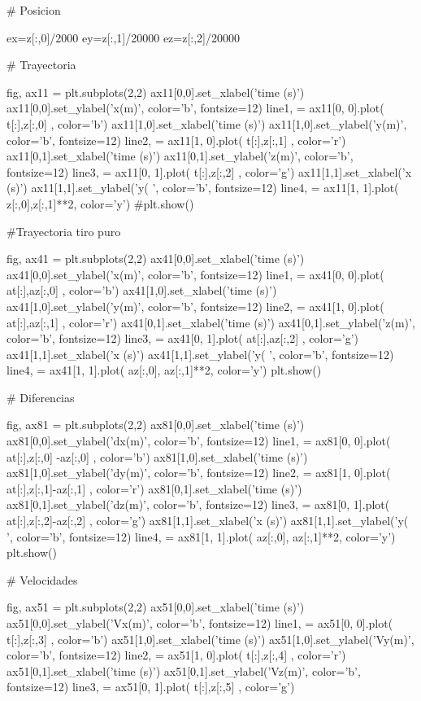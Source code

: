 \documentclass{article}
\begin{document}
\begin{python}
# Posicion

ex=z[:,0]/2000
ey=z[:,1]/20000
ez=z[:,2]/20000

# Trayectoria 

fig, ax11 = plt.subplots(2,2)
ax11[0,0].set_xlabel('time (s)')
ax11[0,0].set_ylabel('x(m)', color='b', fontsize=12)
line1, = ax11[0, 0].plot( t[:],z[:,0] , color='b')
ax11[1,0].set_xlabel('time (s)')
ax11[1,0].set_ylabel('y(m)', color='b', fontsize=12)
line2, = ax11[1, 0].plot( t[:],z[:,1] , color='r')
ax11[0,1].set_xlabel('time (s)')
ax11[0,1].set_ylabel('z(m)', color='b', fontsize=12)
line3, = ax11[0, 1].plot( t[:],z[:,2] , color='g')
ax11[1,1].set_xlabel('x (s)')
ax11[1,1].set_ylabel('y( ', color='b', fontsize=12)
line4, = ax11[1, 1].plot( z[:,0],z[:,1]**2, color='y')
#plt.show()

#Trayectoria tiro puro

fig, ax41 = plt.subplots(2,2)
ax41[0,0].set_xlabel('time (s)')
ax41[0,0].set_ylabel('x(m)', color='b', fontsize=12)
line1, = ax41[0, 0].plot( at[:],az[:,0] , color='b')
ax41[1,0].set_xlabel('time (s)')
ax41[1,0].set_ylabel('y(m)', color='b', fontsize=12)
line2, = ax41[1, 0].plot( at[:],az[:,1] , color='r')
ax41[0,1].set_xlabel('time (s)')
ax41[0,1].set_ylabel('z(m)', color='b', fontsize=12)
line3, = ax41[0, 1].plot( at[:],az[:,2] , color='g')
ax41[1,1].set_xlabel('x (s)')
ax41[1,1].set_ylabel('y( ', color='b', fontsize=12)
line4, = ax41[1, 1].plot( az[:,0], az[:,1]**2, color='y')
plt.show()


# Diferencias

fig, ax81 = plt.subplots(2,2)
ax81[0,0].set_xlabel('time (s)')
ax81[0,0].set_ylabel('dx(m)', color='b', fontsize=12)
line1, = ax81[0, 0].plot( at[:],z[:,0] -az[:,0] , color='b')
ax81[1,0].set_xlabel('time (s)')
ax81[1,0].set_ylabel('dy(m)', color='b', fontsize=12)
line2, = ax81[1, 0].plot( at[:],z[:,1]-az[:,1] , color='r')
ax81[0,1].set_xlabel('time (s)')
ax81[0,1].set_ylabel('dz(m)', color='b', fontsize=12)
line3, = ax81[0, 1].plot( at[:],z[:,2]-az[:,2] , color='g')
ax81[1,1].set_xlabel('x (s)')
ax81[1,1].set_ylabel('y( ', color='b', fontsize=12)
line4, = ax81[1, 1].plot( az[:,0], az[:,1]**2, color='y')
plt.show()



# Velocidades 


fig, ax51 = plt.subplots(2,2)
ax51[0,0].set_xlabel('time (s)')
ax51[0,0].set_ylabel('Vx(m)', color='b', fontsize=12)
line1, = ax51[0, 0].plot( t[:],z[:,3] , color='b')
ax51[1,0].set_xlabel('time (s)')
ax51[1,0].set_ylabel('Vy(m)', color='b', fontsize=12)
line2, = ax51[1, 0].plot( t[:],z[:,4] , color='r')
ax51[0,1].set_xlabel('time (s)')
ax51[0,1].set_ylabel('Vz(m)', color='b', fontsize=12)
line3, = ax51[0, 1].plot( t[:],z[:,5] , color='g')


\end{python}
\end{document}
